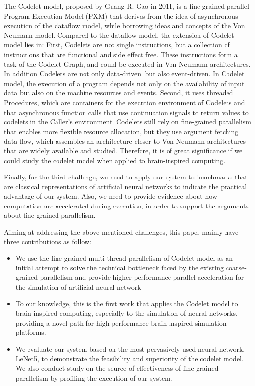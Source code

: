 The Codelet model, proposed by Guang R. Gao in 2011, is a fine-grained parallel Program Execution Model (PXM) that derives from the idea of asynchronous execution of the dataflow model, while borrowing ideas and concepts of the Von Neumann model. Compared to the dataflow model, the extension of Codelet model lies in: First, Codelets are not single instructions, but a collection of instructions that are functional and side effect free. These instructions form a task of the Codelet Graph, and could be executed in Von Neumann architectures. In addition Codelets are not only data-driven, but also event-driven. In Codelet model, the execution of a program depends not only on the availability of input data but also on the machine resources and events. Second, it uses threaded Procedures, which are containers for the execution environment of Codelets and that asynchronous function calls that use continuation signals to return values to codelets in the Caller's environment. Codelets still rely on fine-grained parallelism that enables more flexible resource allocation, but they use argument fetching data-flow, which assembles an architecture closer to Von Neumann architectures that are widely available and studied. Therefore, it is of great significance if we could study the codelet model when applied to brain-inspired computing.

Finally, for the third challenge, we need to apply our system to benchmarks that are classical representations of artificial neural networks to indicate the practical advantage of our system. Also, we need to provide evidence about how computation are accelerated during execution, in order to support the arguments about fine-grained parallelism. 

Aiming at addressing the above-mentioned challenges, this paper mainly have three contributions as follow:
\begin{itemize}
    \item We use the fine-grained multi-thread parallelism of Codelet model as an initial attempt to solve the technical bottleneck faced by the existing coarse-grained parallelism and provide higher performance parallel acceleration for the simulation of artificial neural network.
    \item To our knowledge, this is the first work that applies the Codelet model to brain-inspired computing, especially to the simulation of neural networks, providing a novel path for high-performance brain-inspired simulation platforms.
    \item We evaluate our system based on the most pervasively used neural network, LeNet5, to demonstrate the feasibility and superiority of the codelet model. We also conduct study on the source of effectiveness of fine-grained parallelism by profiling the execution of our system. 

\end{itemize}

